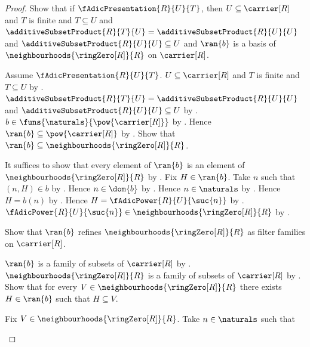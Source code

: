 \begin{proof}
    Show that if $\fAdicPresentation{R}{U}{T}$, then
        $U\subseteq\carrier[R]$ and $T$ is finite and $T\subseteq U$ and
        $\additiveSubsetProduct{R}{T}{U}
            =\additiveSubsetProduct{R}{U}{U}$ and
        $\additiveSubsetProduct{R}{U}{U}\subseteq U$ and
        $\ran{b}$ is a basis of
            $\neighbourhoods{\ringZero[R]}{R}$ on $\carrier[R]$.
    \begin{subproof}
        Assume $\fAdicPresentation{R}{U}{T}$.
        $U\subseteq\carrier[R]$ and $T$ is finite and $T\subseteq U$ by
            .
        $\additiveSubsetProduct{R}{T}{U}
            =\additiveSubsetProduct{R}{U}{U}$ and
            $\additiveSubsetProduct{R}{U}{U}\subseteq U$ by
            .
        $b\in\funs{\naturals}{\pow{\carrier[R]}}$ by
            .
        Hence $\ran{b}\subseteq\pow{\carrier[R]}$ by .
        Show that $\ran{b}\subseteq
            \neighbourhoods{\ringZero[R]}{R}$.
        \begin{subproof}
            It suffices to show that every element of $\ran{b}$ is an
                element of $\neighbourhoods{\ringZero[R]}{R}$ by
                .
            Fix $H\in\ran{b}$.
            Take $n$ such that $(n,H)\in b$ by .
            Hence $n\in\dom{b}$ by .
            Hence $n\in\naturals$ by .
            Hence $H=b(n)$ by .
            Hence $H=\fAdicPower{R}{U}{\suc{n}}$ by
                .
            $\fAdicPower{R}{U}{\suc{n}}
                \in\neighbourhoods{\ringZero[R]}{R}$ by
                .
        \end{subproof}
        Show that $\ran{b}$ refines
            $\neighbourhoods{\ringZero[R]}{R}$ as filter families on
                $\carrier[R]$.
        \begin{subproof}
            $\ran{b}$ is a family of subsets of $\carrier[R]$ by
                .
            $\neighbourhoods{\ringZero[R]}{R}$ is a family of subsets of
                $\carrier[R]$ by .
            Show that for every
                $V\in\neighbourhoods{\ringZero[R]}{R}$ there exists
                $H\in\ran{b}$ such that $H\subseteq V$.
            \begin{subproof}
                Fix $V\in\neighbourhoods{\ringZero[R]}{R}$.
                Take $n\in\naturals$ such that

\end{subproof}
\end{subproof}
\end{subproof}
\end{proof}
